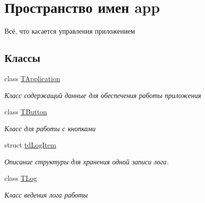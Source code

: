 \hypertarget{namespaceapp}{}\section{Пространство имен app}
\label{namespaceapp}


Всё, что касается управления приложением  


\subsection*{Классы}
\begin{DoxyCompactItemize}
\item 
class \hyperlink{classapp_1_1_t_application}{T\+Application}
\begin{DoxyCompactList}\small\item\em Класс содержащий данные для обеспечения работы приложения \end{DoxyCompactList}\item 
class \hyperlink{classapp_1_1_t_button}{T\+Button}
\begin{DoxyCompactList}\small\item\em Класс для работы с кнопками \end{DoxyCompactList}\item 
struct \hyperlink{structapp_1_1td_log_item}{td\+Log\+Item}
\begin{DoxyCompactList}\small\item\em Описание структуры для хранения одной записи лога. \end{DoxyCompactList}\item 
class \hyperlink{classapp_1_1_t_log}{T\+Log}
\begin{DoxyCompactList}\small\item\em Класс ведения лога работы \end{DoxyCompactList}\end{DoxyCompactItemize}
